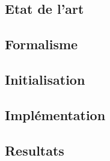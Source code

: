 \subsection{Etat de l'art}

\subsection{Formalisme}

\subsection{Initialisation}

\subsection{Implémentation}

\subsection{Resultats}